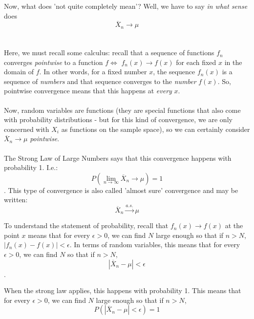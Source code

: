 \documentclass[12pt]{article} %
\begin{document}
Now, what does 'not quite completely mean'? Well, we have to say \emph{in what sense} does $$\overline{X}_n\rightarrow \mu$$ \\\\
Here, we must recall some calculus: recall that a sequence of functions $f_n$ converges                                  
 \emph{pointwise} to a function $f \iff $ $f_n(x) \rightarrow f(x)$ for each fixed $x$ in the domain of $f$. In other words, for a fixed number $x$, the sequence $f_n(x)$ is a sequence of \emph{numbers} and that sequence converges to the \emph{number} $f(x)$. So, pointwise convergence means that this happens at \emph{every} $x$.\\\\
Now, random variables are functions (they are special functions that also come with probability distributions - but for this kind of convergence, we are only concerned with $X_i$ as functions on the sample space), so we can certainly consider $\overline{X}_n\rightarrow\mu$ \emph{pointwise}.\\\\
The Strong Law of Large Numbers says that this convergence happens with probability 1. I.e.:
$$P(\lim_{n\rightarrow\infty} \overline{X}_n \rightarrow\mu) = 1$$.
This type of convergence is also called 'almost sure' convergence and may be written:
$$\overline{X}_n \xrightarrow{a.s.} \mu$$

To understand the statement of probability, recall that $f_n(x)\rightarrow f(x)$ at the point $x$ means that for every $\epsilon>0$, we can find $N$ large enough so that if $n>N$, $|f_n(x) - f(x)|<\epsilon$. In terms of random variables, this means that for every $\epsilon>0$, we can find $N$ so that if $n>N$,
$$|\overline{X}_n -\mu|<\epsilon$$.

When the strong law applies, this happens with probability 1. This means that for every $\epsilon>0$, we can find $N$ large enough so that if $n>N$,
$$P(|\overline{X}_n - \mu| < \epsilon) = 1$$
\end{document}
